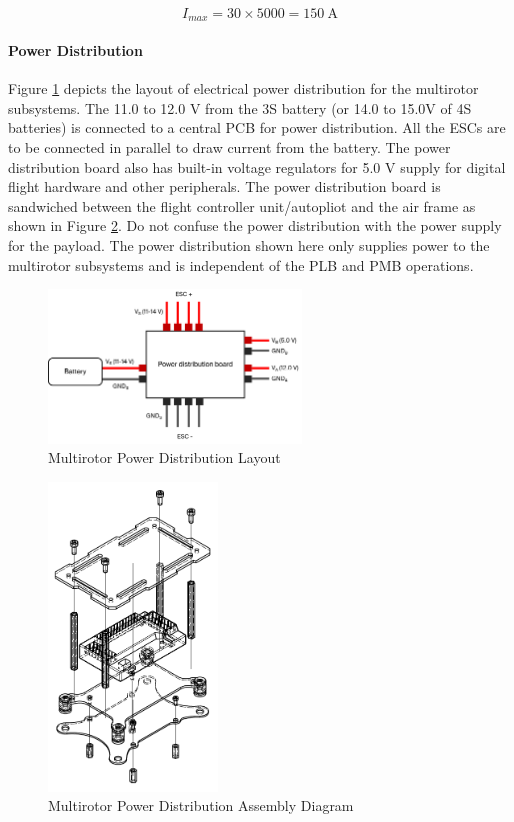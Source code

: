 $$
I_{max}=30 \times 5000 = 150~\text{A}
$$

\paragraph{Power Distribution}

Figure \ref{fig:pdb} depicts the layout of electrical power distribution for the multirotor subsystems. The 11.0 to 12.0 V from the 3S battery (or 14.0 to 15.0V of 4S batteries) is connected to a central PCB for power distribution. All the ESCs are to be connected in parallel to draw current from the battery. The power distribution board also has built-in voltage regulators for 5.0 V supply for digital flight hardware and other peripherals. The power distribution board is sandwiched between the flight controller unit/autopliot and the air frame as shown in Figure \ref{fig:pdb2}. Do not confuse the power distribution with the power supply for the payload. The power distribution shown here only supplies power to the multirotor subsystems and is independent of the PLB and PMB operations.

\begin{figure}[h]
    \centering
    \includegraphics[width=0.6\textwidth]{img/pdb}
    \caption{Multirotor Power Distribution Layout}
    \label{fig:pdb}
\end{figure}

\begin{figure}[h]
    \centering
    \includegraphics[width=0.4\textwidth]{img/pdb2}
    \caption{Multirotor Power Distribution Assembly Diagram}
    \label{fig:pdb2}
\end{figure}

